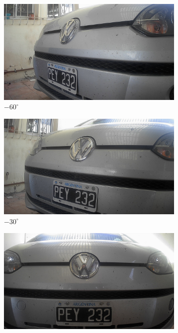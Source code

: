 \begin{figure}
    \centering
    \begin{subfigure}{.15\textwidth}
        \centering
        \includegraphics[width=\textwidth]{imgs/test-angulos/-60_50.jpg}
        \caption{$-60^\circ$}
    \end{subfigure}
    \begin{subfigure}{.15\textwidth}
        \centering
        \includegraphics[width=\textwidth]{imgs/test-angulos/-30_50.jpg}
        \caption{$-30^\circ$}
    \end{subfigure}
    \begin{subfigure}{.15\textwidth}
        \centering
        \includegraphics[width=\textwidth]{imgs/test-angulos/0_50.jpg}

\end{subfigure}
\end{figure}
